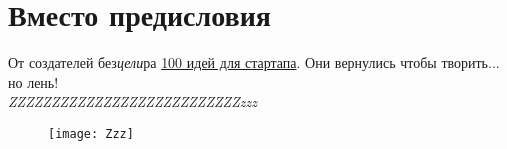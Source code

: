 
\section*{Вместо предисловия}
\vspace*{\fill}
От создателей без\emph{цели}ра \href{https://antoniii.github.io/}{100 идей для стартапа}.
Они вернулись чтобы творить... но лень!\\

\emph{\Huge{ZZZ}\LARGE{ZZZ}\Large{ZZZ}\large{ZZZ}ZZZ\small{ZZZ}\footnotesize{ZZZ}\scriptsize{ZZZ}\tiny{ZZZ}\tiny{zzz}}

\begin{figure}[ht!]
    \centering
    \texttt{[image: Zzz]}
\end{figure}

\vfill

